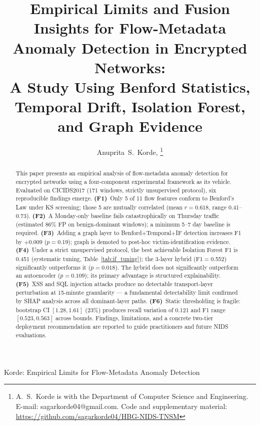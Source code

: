 \documentclass[journal,10pt,twoside]{IEEEtran}
\begin{document}
\title{Empirical Limits and Fusion Insights for Flow-Metadata
  Anomaly Detection in Encrypted Networks:\\
  A Study Using Benford Statistics, Temporal Drift,
  Isolation Forest, and Graph Evidence}

\author{Anuprita~S.~Korde,%
  \thanks{A.~S.~Korde is with the Department of Computer Science
    and Engineering.
    E-mail: sagarkorde04@gmail.com.
    Code and supplementary material:
    \url{https://github.com/sagarkorde04/HBG-NIDS-TNSM}}}

%
{Korde: Empirical Limits for Flow-Metadata Anomaly Detection}

\maketitle
\IEEEpeerreviewmaketitle

\begin{abstract}
This paper presents an empirical analysis of flow-metadata anomaly
detection for encrypted networks using a four-component experimental
framework as its vehicle.  Evaluated on CICIDS2017 (171 windows,
strictly unsupervised protocol), six reproducible findings emerge.
\textbf{(F1)}~Only 5 of 11 flow features conform to Benford's Law
under KS screening; those 5 are mutually correlated (mean
$r{=}0.618$, range 0.41--0.73).
\textbf{(F2)}~A Monday-only baseline fails catastrophically on
Thursday traffic (estimated 86\% FP on benign-dominant windows);
a minimum 5--7 day baseline is required.
\textbf{(F3)}~Adding a graph layer to Benford+Temporal+IF detection
increases F1 by $+0.009$ ($p{=}0.19$); graph is demoted to post-hoc
victim-identification evidence.
\textbf{(F4)}~Under a strict unsupervised protocol, the best
achievable Isolation Forest F1 is 0.451 (systematic tuning,
Table~\ref{tab:if_tuning}); the 3-layer hybrid (F1$=$0.552)
significantly outperforms it ($p{=}0.018$).  The hybrid does not
significantly outperform an autoencoder ($p{=}0.109$); its primary
advantage is structured explainability.
\textbf{(F5)}~XSS and SQL injection attacks produce no detectable
transport-layer perturbation at 15-minute granularity --- a
fundamental detectability limit confirmed by SHAP analysis across
all dominant-layer paths.
\textbf{(F6)}~Static thresholding is fragile: bootstrap CI
$[1.28, 1.61]$ (23\%) produces recall variation of 0.121 and F1
range $[0.523, 0.563]$ across bounds.
Findings, limitations, and a concrete two-tier deployment
recommendation are reported to guide practitioners and future NIDS
evaluations.
\end{abstract}
\end{document}
